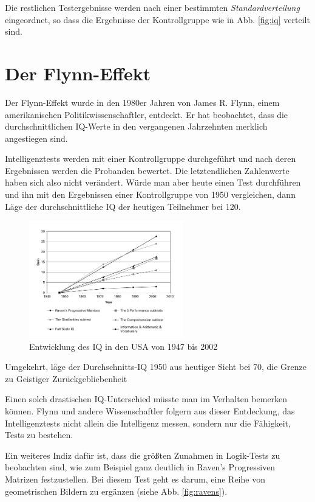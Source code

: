 Die restlichen Testergebnisse werden nach einer bestimmten \emph{Standardverteilung} eingeordnet, so dass die Ergebnisse der Kontrollgruppe wie in Abb. \ref{fig:iq} verteilt sind.

\section{Der Flynn-Effekt}
\label{sec:flynn}

Der Flynn-Effekt wurde in den 1980er Jahren von James R. Flynn, einem amerikanischen Politikwissenschaftler, entdeckt. Er hat beobachtet, dass die durchschnittlichen IQ-Werte in den vergangenen Jahrzehnten merklich angestiegen sind.

Intelligenztests werden mit einer Kontrollgruppe durchgeführt und nach deren Ergebnissen werden die Probanden bewertet. Die letztendlichen Zahlenwerte haben sich also nicht verändert. Würde man aber heute einen Test durchführen und ihn mit den Ergebnissen einer Kontrollgruppe von 1950 vergleichen, dann Läge der durchschnittliche IQ der heutigen Teilnehmer bei 120.

\begin{figure}[H]
  \centering
  \includegraphics[width=0.6\textwidth]{img/Flynn.png}
  \caption{Entwicklung des IQ in den USA von 1947 bis 2002 \cite{flynn}}
  \label{fig:flynn}
\end{figure}

Umgekehrt, läge der Durchschnitts-IQ 1950 aus heutiger Sicht bei 70, die Grenze zu \glqq Geistiger Zurückgebliebenheit\grqq{}
\cite{ted_flynn}

Einen solch drastischen IQ-Unterschied müsste man im Verhalten bemerken können. Flynn und andere Wissenschaftler folgern aus dieser Entdeckung, das Intelligenztests nicht allein die Intelligenz messen, sondern nur die Fähigkeit, Tests zu bestehen.

Ein weiteres Indiz dafür ist, dass die größten Zunahmen in Logik-Tests zu beobachten sind, wie zum Beispiel ganz deutlich in \glqq Raven's Progressiven Matrizen \grqq{} festzustellen. Bei diesem Test geht es darum, eine Reihe von geometrischen Bildern zu ergänzen (siehe Abb. \ref{fig:ravens}).

